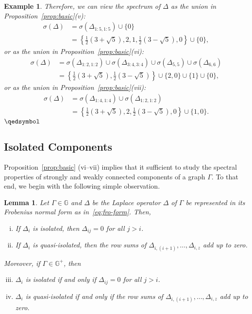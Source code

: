 \documentclass{article}
\newtheorem{example}[theorem]{Example}
\newtheorem{lemma}[theorem]{Lemma}
\begin{document}
\begin{example}
Therefore, we can view the spectrum of $\Delta$ as the union in Proposition~\ref{prop:basic}(v):
\begin{align*}
\sigma(\Delta) &= \sigma(\Delta_{1:5,1:5})\cup\{0\} \\
&= \left\{\frac{1}{2}(3+\sqrt{5}),2,1,\frac{1}{2}(3-\sqrt{5}),0\right\}\cup\{0\},
\end{align*}
or as the union in Proposition~\ref{prop:basic}(vi):
\begin{align*}
\sigma(\Delta) &= \sigma(\Delta_{1:2,1:2})\cup\sigma(\Delta_{3:4,3:4})\cup\sigma(\Delta_{5,5})\cup\sigma(\Delta_{6,6}) \\
&= \left\{\frac{1}{2}(3+\sqrt{5}),\frac{1}{2}(3-\sqrt{5})\right\}\cup\{2,0\}\cup\{1\}\cup\{0\},
\end{align*}
or as the union in Proposition~\ref{prop:basic}(vii):
\begin{align*}
\sigma(\Delta) &= \sigma(\Delta_{1:4,1:4})\cup\sigma(\Delta_{1:2,1:2}) \\
&= \left\{\frac{1}{2}(3+\sqrt{5}),2,\frac{1}{2}(3-\sqrt{5}),0\right\}\cup\{1,0\}.
\end{align*}
\hfill$\qedsymbol$
\end{example}

\subsection{Isolated Components}
Proposition~\ref{prop:basic} (vi--vii) implies that it sufficient to study the spectral properties of strongly and weakly connected components of a graph $\Gamma$.
To that end, we begin with the following simple observation. 

\begin{lemma}\label{lem:isolated}
Let $\Gamma\in\mathbb{G}$ and $\Delta$ be the Laplace operator $\Delta$ of $\Gamma$ be represented in its Frobenius normal form as in~\eqref{eq:fro-form}.
Then,
\begin{enumerate}[i.]
\item	If $\Delta_{i}$ is isolated, then $\Delta_{ij}=0$ for all $j>i$.
\item	If $\Delta_{i}$ is quasi-isolated, then the row sums of $\Delta_{i,(i+1)},\ldots,\Delta_{i,z}$ add up to zero. 
\end{enumerate}
Moreover, if $\Gamma\in\mathbb{G}^{+}$, then 
\begin{enumerate}[i.]
\setcounter{enumi}{2}
\item	$\Delta_{i}$ is isolated if and only if $\Delta_{ij}=0$ for all $j>i$. 
\item	$\Delta_{i}$ is quasi-isolated if and only if the row sums of $\Delta_{i,(i+1)},\ldots,\Delta_{i,z}$ add up to zero. 
\end{enumerate}
\end{lemma}
\end{document}
